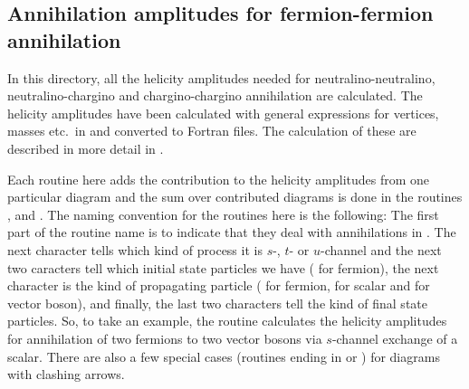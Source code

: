
\subsection{Annihilation amplitudes for fermion-fermion annihilation}

In this directory, all the helicity amplitudes needed for
neutralino-neutralino, neutralino-chargino and chargino-chargino
annihilation are calculated. The helicity amplitudes have been
calculated with general expressions for vertices, masses etc.\ in
 and converted to Fortran files. The calculation of these
are described in more detail in \cite{Edsjo:1997bg}.

Each routine here adds the contribution to the helicity amplitudes
from one particular diagram and the sum over contributed diagrams is
done in the routines , 
and . The naming convention for the routines
here is the following: The first part of the routine name is
 to indicate that they deal with annihilations in \ds. The
next character tells which kind of process it is $s$-, $t$- or
$u$-channel and the next two caracters tell which initial state
particles we have ( for fermion), the next character is the
kind of propagating particle ( for fermion,  for
scalar and  for vector boson), and finally, the last two
characters tell the kind of final state particles. So, to take an
example, the routine  calculates the helicity
amplitudes for annihilation of two fermions to two vector
bosons via $s$-channel exchange of a scalar. There are also a few
special cases (routines ending in  or ) for
diagrams with clashing arrows.

